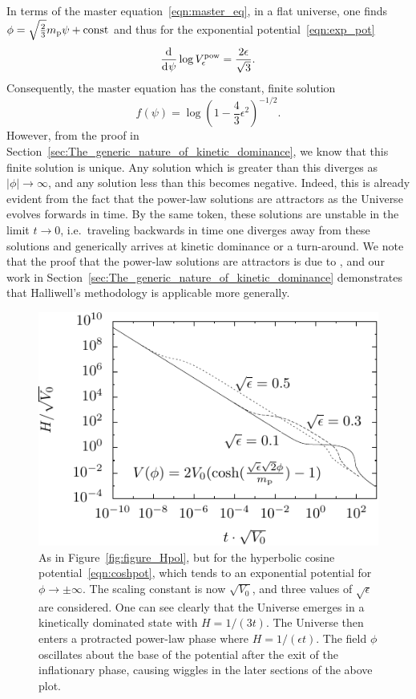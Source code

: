 In terms of the master equation~\eqref{eqn:master_eq}, in a flat universe, one finds $\phi = \sqrt{\frac{2}{3}}m_{\mathrm{p}} \psi + \mathrm{const} $ and thus for the exponential potential~\eqref{eqn:exp_pot} 
%
\begin{equation}
  \frac{\operatorname{d}^{}\!{}}{\operatorname{d}^{}\!{\psi}} \log V^\mathrm{pow}_\epsilon = \frac{2\epsilon}{\sqrt{3}}. 
\end{equation}
%
Consequently, the master equation has the constant, finite solution
%
\begin{equation}
  f(\psi) = \log{\left(1-\frac{4}{3}\epsilon^2\right)}^{-1/2}.
  \label{eqn:uf_power_law}
\end{equation}
%
However, from the proof in Section~\ref{sec:The_generic_nature_of_kinetic_dominance}, we know that this finite solution is unique. Any solution which is greater than this diverges as $|\phi|\to\infty$, and any solution less than this becomes negative.  Indeed, this is already evident from the fact that the power-law solutions are attractors as the Universe evolves forwards in time. By the same token, these solutions are unstable in the limit $t \to 0$, i.e.\ traveling backwards in time one diverges away from these solutions and generically arrives at kinetic dominance or a turn-around.  We note that the proof that the power-law solutions are attractors is due to \citet{halliwell_scalar_1987}, and our work in Section~\ref{sec:The_generic_nature_of_kinetic_dominance} demonstrates that Halliwell's methodology is applicable more generally.

%
\begin{figure}[ht]
  \includegraphics[width=\textwidth]{chapter_kinetic_dominance/figures/Hlam}
  \caption{As in Figure~\protect\ref{fig:figure_Hpol}, but for the hyperbolic cosine potential~\protect\eqref{eqn:coshpot}, which tends to an exponential potential for $\phi \to \pm\infty$. The scaling constant is now $\sqrt{V_0}$, and three values of $\sqrt{\epsilon}$ are considered. One can see clearly that the Universe emerges in a kinetically dominated state with $H=1/(3t)$. The Universe then enters a protracted power-law phase where $H = 1/(\epsilon t)$. The field $\phi$ oscillates about the base of the potential after the exit of the inflationary phase, causing wiggles in the later sections of the above plot.\label{fig:figure_Hlam}}
\end{figure}
%

